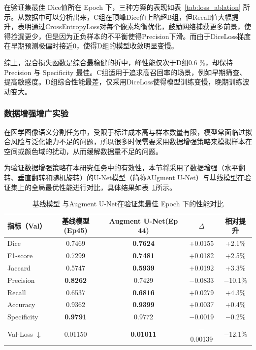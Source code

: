 在验证集最佳 Dice值所在 Epoch 下，三种方案的表现如表~\ref{tab:loss_ablation} 所示。从数据中可以分析出来，C组在顶峰Dice值上略超B组，但Recall值大幅提升，表明通过CrossEntropyLoss对每个像素均衡优化，鼓励网络捕获更多前景，使得捡漏更少，但是因为正负样本的不平衡使得Precision下滑。而由于DiceLoss梯度在早期预测极偏时接近0，使得D组的模型收敛明显变慢。

综上，混合损失函数是综合最稳健的折中，峰性能仅次于D组0.6 \%，却保持 Precision 与 Specificity 最佳。C组适用于追求高召回率的场景，例如早期筛查、提高敏感度。D组综合性能最差，仅采用DiceLoss使得模型训练变慢，晚期训练波动变大。

\subsubsection{数据增强增广实验}

在医学图像语义分割任务中，受限于标注成本高与样本数量有限，模型常面临过拟合风险与泛化能力不足的问题，所以很多时候需要采用数据增强策略来模拟样本在空间或颜色域的扰动，从而缓解数据量不足的问题。

为验证数据增强策略在本研究任务中的有效性，本节将采用了数据增强（水平翻转、垂直翻转和随机旋转）的U-Net模型（简称AUgment U-Net）与基线模型在验证集上的全局最优性能进行对比，具体结果如表~\ref{tab:augment_best}所示。

\begin{table}[htbp]
    \centering
    \caption{基线模型 与Augment U-Net在验证集最佳 Epoch 下的性能对比}
    \label{tab:augment_best}
    \begin{tabular}{lcccc}
        \toprule
        指标（Val） & 基线模型(Ep45) & Augment U-Net(Ep 44) & $\Delta$ & 相对提升 \\
        \midrule
        Dice        & 0.7469 & \textbf{0.7624} & +0.0155 & +2.1\% \\
        F1-score    & 0.7299 & \textbf{0.7481} & +0.0182 & +2.5\% \\
        Jaccard     & 0.5747 & \textbf{0.5939} & +0.0192 & +3.3\% \\
        Precision   & \textbf{0.8262} & 0.7429 & $-$0.0833 & $-$10.1\% \\
        Recall      & 0.6537 & \textbf{0.6816} & +0.0279 & +4.3\% \\
        Accuracy    & 0.9362 & \textbf{0.9399} & +0.0037 & +0.4\% \\
        Specificity & \textbf{0.9791} & 0.9772 & $-$0.0019 & $-$0.2\% \\
        Val-Loss $\downarrow$ & 0.01150 & \textbf{0.01011} & $-$0.00139 & $-$12.1\% \\
        \bottomrule
    \end{tabular}
\end{table}

